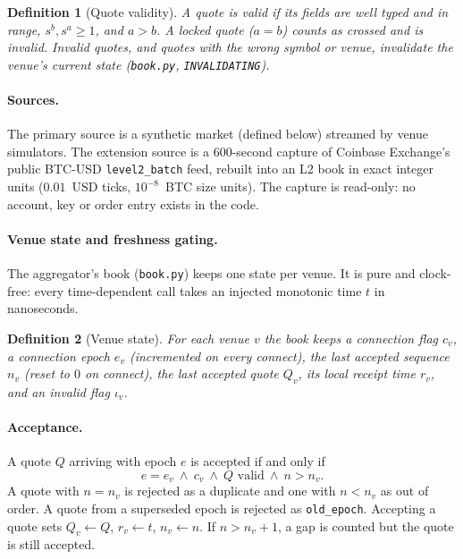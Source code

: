 \documentclass[11pt]{article}
\newtheorem{definition}{Definition}
\theoremstyle{remark}
\newcommand{\code}[1]{\texttt{#1}}
\begin{document}
\begin{definition}[Quote validity]
A quote is \emph{valid} if its fields are well typed and in range, $s^b, s^a \ge 1$, and
$a > b$. A locked quote ($a = b$) counts as crossed and is invalid. Invalid quotes, and quotes
with the wrong symbol or venue, invalidate the venue's current state
(\code{book.py}, \code{INVALIDATING}).
\end{definition}

\paragraph{Sources.}
The primary source is a synthetic market (defined below) streamed by venue
simulators. The extension source is a 600-second capture of Coinbase Exchange's public BTC-USD
\code{level2\_batch} feed, rebuilt into an L2 book in exact integer units ($0.01$~USD ticks,
$10^{-8}$~BTC size units). The capture is read-only: no account, key or order entry exists in
the code.

\paragraph{Venue state and freshness gating.}

The aggregator's book (\code{book.py}) keeps one state per venue. It is pure and clock-free:
every time-dependent call takes an injected monotonic time $t$ in nanoseconds.

\begin{definition}[Venue state]
For each venue $v$ the book keeps a connection flag $c_v$, a connection epoch $e_v$
(incremented on every connect), the last accepted sequence $n_v$ (reset to $0$ on connect), the
last accepted quote $Q_v$, its local receipt time $r_v$, and an invalid flag $\iota_v$.
\end{definition}

\paragraph{Acceptance.}
A quote $Q$ arriving with epoch $e$ is accepted if and only if
\[
  e = e_v \ \wedge\ c_v \ \wedge\ Q \text{ valid} \ \wedge\ n > n_v .
\]
A quote with $n = n_v$ is rejected as a duplicate and one with $n < n_v$ as out of order. A
quote from a superseded epoch is rejected as \code{old\_epoch}. Accepting a quote sets
$Q_v \leftarrow Q$, $r_v \leftarrow t$, $n_v \leftarrow n$. If $n > n_v + 1$, a gap is counted
but the quote is still accepted.
\end{document}
